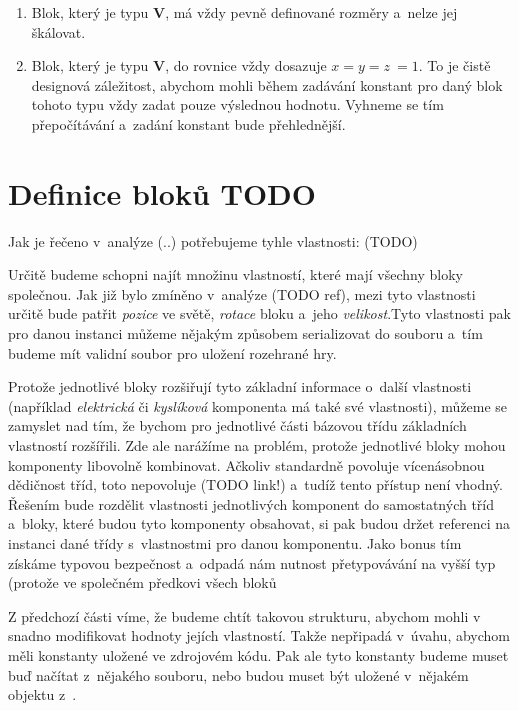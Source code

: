 \begin{enumerate}
	\item Blok, který je typu \textbf{V}, má vždy pevně definované rozměry a~nelze jej škálovat.
	\item Blok, který je typu \textbf{V}, do rovnice vždy dosazuje $ x = y = z~= 1$.
	\subitem To je čistě designová záležitost, abychom mohli během zadávání konstant pro daný blok tohoto typu vždy zadat pouze výslednou hodnotu. Vyhneme se tím přepočítávání a~zadání konstant bude přehlednější.
\end{enumerate}






\section{Definice bloků TODO}

Jak je řečeno v~analýze (..) potřebujeme tyhle vlastnosti: (TODO)

Určitě budeme schopni najít množinu vlastností, které mají všechny bloky společnou. Jak již bylo zmíněno v~analýze (TODO ref), mezi tyto vlastnosti určitě bude patřit  \textit{pozice} ve světě, \textit{rotace} bloku a~jeho \textit{velikost}.Tyto vlastnosti pak pro danou instanci můžeme nějakým způsobem serializovat do souboru a~tím budeme mít validní soubor pro uložení rozehrané hry. 

Protože jednotlivé bloky rozšiřují tyto základní informace o~další vlastnosti (například \textit{elektrická} či \textit{kyslíková} komponenta má také své vlastnosti), můžeme se zamyslet nad tím, že bychom pro jednotlivé části bázovou třídu základních vlastností rozšířili. Zde ale narážíme na problém, protože jednotlivé bloky mohou komponenty libovolně kombinovat. Ačkoliv \CPP{} standardně povoluje vícenásobnou dědičnost tříd, \UE{} toto nepovoluje (TODO link!) a~tudíž tento přístup není vhodný. Řešením bude rozdělit vlastnosti jednotlivých komponent do samostatných tříd a~bloky, které budou tyto komponenty obsahovat, si pak budou držet referenci na instanci dané třídy s~vlastnostmi pro danou komponentu. Jako bonus tím získáme typovou bezpečnost a~odpadá nám nutnost přetypovávání na vyšší typ (protože ve společném předkovi všech bloků

Z předchozí části víme, že budeme chtít takovou strukturu, abychom mohli v~\UE{} snadno modifikovat hodnoty jejích vlastností. Takže nepřipadá v~úvahu, abychom měli konstanty uložené ve zdrojovém kódu. Pak ale tyto konstanty budeme muset buď načítat z~nějakého souboru, nebo budou muset být uložené v~nějakém objektu z~\UE{}.

